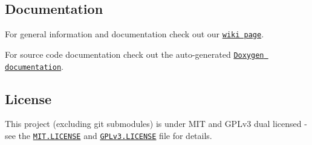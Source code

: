 \subsection*{Documentation}


\begin{DoxyItemize}
\item For general information and documentation check out our \href{https://github.com/Autonomous-Racing-PG/ros.package/wiki}{\tt wiki page}.
\item For source code documentation check out the auto-\/generated \href{https://autonomous-racing-pg.github.io/ros.package/html/index.html}{\tt Doxygen documentation}.
\end{DoxyItemize}

\subsection*{License}

This project (excluding git submodules) is under M\+IT and G\+P\+Lv3 dual licensed -\/ see the \href{MIT.LICENSE}{\tt M\+I\+T.\+L\+I\+C\+E\+N\+SE} and \href{GPLv3.LICENSE}{\tt G\+P\+Lv3.\+L\+I\+C\+E\+N\+SE} file for details. 